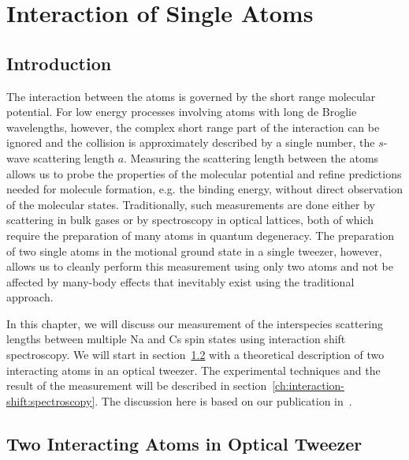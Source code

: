 
\chapter{Interaction of Single Atoms}
\label{ch:interaction-shift}

\section{Introduction}
\label{ch:interaction-shift:introduction}

The interaction between the atoms is governed by the short range molecular potential.
For low energy processes involving atoms with long de Broglie wavelengths, however,
the complex short range part of the interaction
can be ignored and the collision is approximately described by a single number,
the $s$-wave scattering length $a$.
Measuring the scattering length between the atoms allows us to probe the properties
of the molecular potential and refine predictions needed for molecule formation,
e.g. the binding energy, without direct observation of the molecular states.
Traditionally, such measurements are done either by scattering in bulk gases
or by spectroscopy in optical lattices, both of which require the preparation
of many atoms in quantum degeneracy.
The preparation of two single atoms in the motional ground state in a single tweezer,
however, allows us to cleanly perform this measurement using only two atoms
and not be affected by many-body effects that inevitably exist using the traditional approach.

In this chapter, we will discuss our measurement of the interspecies scattering lengths
between multiple Na and Cs spin states using interaction shift spectroscopy.
We will start in section~\ref{ch:interaction-shift:theory}
with a theoretical description of two interacting atoms in an optical tweezer.
The experimental techniques and the result of the measurement will be described
in section~\ref{ch:interaction-shift:spectroscopy}.
The discussion here is based on our publication in~\cite{hood_multichannel_2020}.

\section{Two Interacting Atoms in Optical Tweezer}
\label{ch:interaction-shift:theory}


